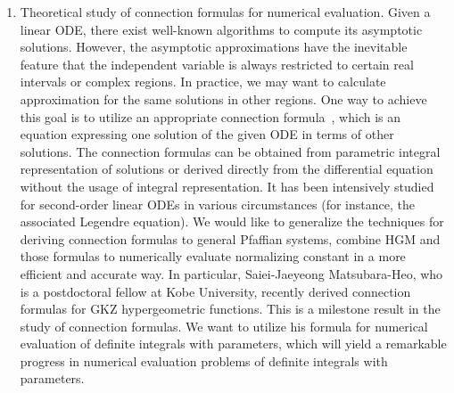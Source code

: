 \documentclass[10pt,a4paper]{article}
\begin{document}
\begin{enumerate}
\item Theoretical study of connection formulas for numerical evaluation. Given a linear ODE, there exist well-known algorithms to compute its asymptotic solutions. However, the asymptotic approximations have the inevitable feature that the independent variable is always restricted to certain real intervals or complex regions. In practice, we may want to calculate approximation for the same solutions in other regions. One way to achieve this goal is to utilize an appropriate connection formula~\cite{Oliver74}, which is an equation expressing one solution of the given ODE in terms of other solutions. The connection formulas can be obtained from parametric integral representation of solutions or derived directly from the differential equation without the usage of integral representation. It
has been intensively studied for second-order linear ODEs in various circumstances (for instance, the associated Legendre equation).
We would like to generalize the techniques for deriving connection formulas to general Pfaffian systems, combine HGM and those formulas to numerically evaluate normalizing constant in a more efficient and accurate way. In particular, Saiei-Jaeyeong Matsubara-Heo, who is a postdoctoral fellow at Kobe University, recently derived connection formulas for GKZ hypergeometric functions. This is a milestone result in the study of connection formulas. We want to utilize his formula for numerical evaluation of definite integrals with parameters, which will yield a remarkable progress in numerical evaluation problems of definite integrals with parameters.  



\end{enumerate}
\end{document}
